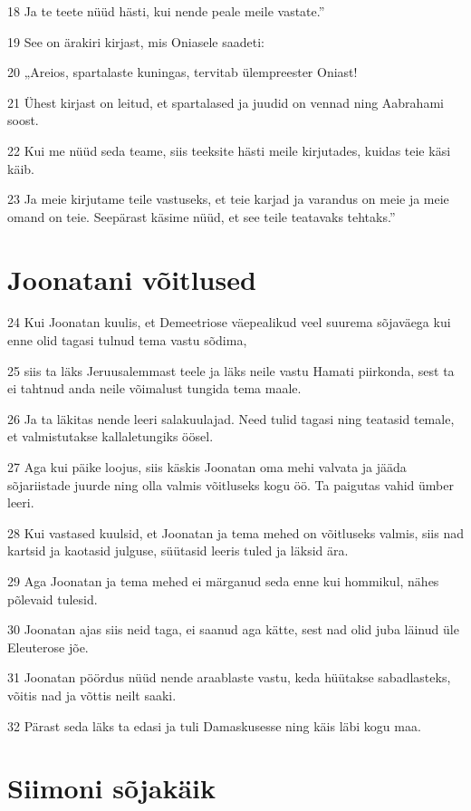 \par 18 Ja te teete nüüd hästi, kui nende peale meile vastate.”
\par 19 See on ärakiri kirjast, mis Oniasele saadeti:
\par 20 „Areios, spartalaste kuningas, tervitab ülempreester Oniast!
\par 21 Ühest kirjast on leitud, et spartalased ja juudid on vennad ning Aabrahami soost.
\par 22 Kui me nüüd seda teame, siis teeksite hästi meile kirjutades, kuidas teie käsi käib.
\par 23 Ja meie kirjutame teile vastuseks, et teie karjad ja varandus on meie ja meie omand on teie. Seepärast käsime nüüd, et see teile teatavaks tehtaks.” 

\section*{Joonatani võitlused}

\par 24 Kui Joonatan kuulis, et Demeetriose väepealikud veel suurema sõjaväega kui enne olid tagasi tulnud tema vastu sõdima,
\par 25 siis ta läks Jeruusalemmast teele ja läks neile vastu Hamati piirkonda, sest ta ei tahtnud anda neile võimalust tungida tema maale.
\par 26 Ja ta läkitas nende leeri salakuulajad. Need tulid tagasi ning teatasid temale, et valmistutakse kallaletungiks öösel.
\par 27 Aga kui päike loojus, siis käskis Joonatan oma mehi valvata ja jääda sõjariistade juurde ning olla valmis võitluseks kogu öö. Ta paigutas vahid ümber leeri.
\par 28 Kui vastased kuulsid, et Joonatan ja tema mehed on võitluseks valmis, siis nad kartsid ja kaotasid julguse, süütasid leeris tuled ja läksid ära.
\par 29 Aga Joonatan ja tema mehed ei märganud seda enne kui hommikul, nähes põlevaid tulesid.
\par 30 Joonatan ajas siis neid taga, ei saanud aga kätte, sest nad olid juba läinud üle Eleuterose jõe.
\par 31 Joonatan pöördus nüüd nende araablaste vastu, keda hüütakse sabadlasteks, võitis nad ja võttis neilt saaki.
\par 32 Pärast seda läks ta edasi ja tuli Damaskusesse ning käis läbi kogu maa. 

\section*{Siimoni sõjakäik}

